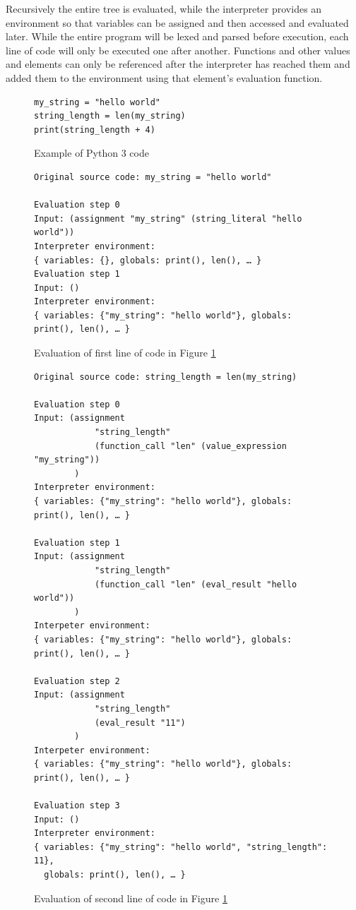 Recursively the entire tree is evaluated, while the interpreter provides an environment so that variables can be assigned and then accessed and evaluated later. While the entire program will be lexed and parsed before execution, each line of code will only be executed one after another. Functions and other values and elements can only be referenced after the interpreter has reached them and added them to the environment using that element's evaluation function.

\begin{figure}[H]
\centering
\begin{verbatim}
my_string = "hello world"
string_length = len(my_string)
print(string_length + 4)
\end{verbatim}
\caption{Example of Python 3 code}
\label{fig:pythoncode} %
\end{figure}

\begin{figure}[H]
\centering
\begin{verbatim}
Original source code: my_string = "hello world"

Evaluation step 0
Input: (assignment "my_string" (string_literal "hello world"))
Interpreter environment:
{ variables: {}, globals: print(), len(), … }
Evaluation step 1
Input: ()
Interpreter environment:
{ variables: {"my_string": "hello world"}, globals: print(), len(), … }
\end{verbatim}
\caption{Evaluation of first line of code in Figure \ref{fig:pythoncode}}
\label{fig:pythoneval1} %
\end{figure}

\begin{figure}[H]
\centering
\begin{verbatim}
Original source code: string_length = len(my_string)

Evaluation step 0
Input: (assignment
            "string_length"
            (function_call "len" (value_expression "my_string"))
        )
Interpreter environment:
{ variables: {"my_string": "hello world"}, globals: print(), len(), … }

Evaluation step 1
Input: (assignment
            "string_length"
            (function_call "len" (eval_result "hello world"))
        )
Interpeter environment:
{ variables: {"my_string": "hello world"}, globals: print(), len(), … }

Evaluation step 2
Input: (assignment
            "string_length"
            (eval_result "11")
        )
Interpeter environment:
{ variables: {"my_string": "hello world"}, globals: print(), len(), … }

Evaluation step 3
Input: ()
Interpreter environment:
{ variables: {"my_string": "hello world", "string_length": 11},
  globals: print(), len(), … }
\end{verbatim}
\caption{Evaluation of second line of code in Figure \ref{fig:pythoncode}}
\label{fig:pythoneval2} %
\end{figure}

